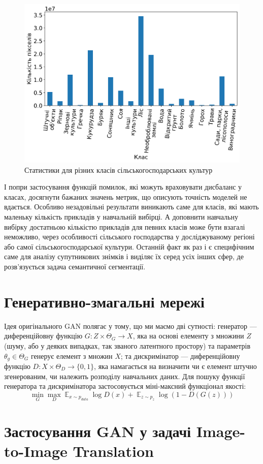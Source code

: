 \documentclass{ConfFTI}
\DeclareMathOperator{\E}{\mathbb{E}}
\begin{document}
\begin{figure}[ht!]
	\centering
	\includegraphics[width=0.49 \textwidth]{dist_real.png}
	\caption{Статистики для різних класів сільськогосподарських культур}
	\label{fig:pixels_per_class}
\end{figure}

І попри застосування
функцій помилок, які можуть враховувати дисбаланс у
класах, досягнути бажаних значень метрик, що описують точність
моделей не вдається.
Особливо незадовільні результати виникають саме для класів,
які мають маленьку кількість прикладів у навчальній вибірці.
А доповнити навчальну вибірку достатньою кількістю
прикладів для певних класів може бути взагалі неможливо,
через особливості сільського господарства у досліджуваному регіоні
або самої сільськогосподарської культури. Останній факт як раз
і є специфічним саме для аналізу супутникових знімків і
виділяє їх серед усіх інших сфер,
де розв'язується задача семантичної сегментації.

\section{Генеративно-змагальні мережі}

Ідея оригінального GAN  \cite{goodfellow2014generative}
полягає у тому, що ми маємо дві сутності:
генератор --- диференційовну функцію $G: Z \times \Theta_G \rightarrow X$, яка
на основі елементу з множини $Z$(шуму, або у деяких випадках,
так званого латентного простору) та параметрів $\theta_g \in \Theta_G$
генерує елемент з множин $X$; та дискримінатор
--- диференційовну функцію $D: X \times \Theta_D \rightarrow \{0, 1\}$, яка
намагається на визначити чи є елемент штучно згенерованим, чи
належить розподілу навчальних даних. Для пошуку функції
генератора та дискримінатора застосовується міні-максний функціонал якості:
$$ \min\limits_{G}\max\limits_{D}
	\E_{x \sim p_{data}} \log D(x) +
	\E_{z \sim p_{z}} \log (1 - D(G(z))) $$

\section{Застосування GAN у задачі Image-to-Image Translation}
\end{document}
